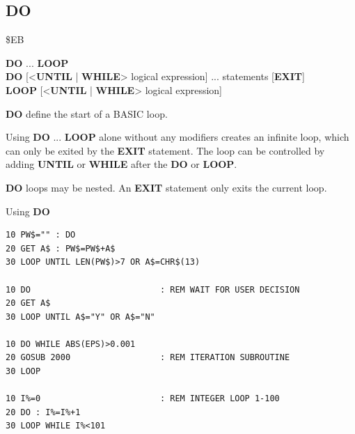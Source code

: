 
\newpage
\subsection{DO}
\begin{description}[leftmargin=2cm,style=nextline]
\item [Token:]    \$EB

\item [Format:]   {\bf DO} ... {\bf LOOP} \\
                  {\bf DO} [<{\bf UNTIL} | {\bf WHILE}> logical expression] ... statements [{\bf EXIT}] \\
                  {\bf LOOP} [<{\bf UNTIL} | {\bf WHILE}> logical expression]

\item [Usage:]    {\bf DO} define the start of a BASIC loop.

                  Using {\bf DO} ... {\bf LOOP} alone without any modifiers creates an infinite loop, which can only be exited by the {\bf EXIT} statement. The loop can be controlled by adding {\bf UNTIL} or {\bf WHILE} after the {\bf DO} or {\bf LOOP}.

\item [Remarks:]  {\bf DO} loops may be nested. An {\bf EXIT} statement only exits the current loop.

\item [Examples:] Using {\bf DO}

\begin{tcolorbox}[colback=black,coltext=white]
\verbatimfont{\codefont}
\begin{verbatim}
10 PW$="" : DO
20 GET A$ : PW$=PW$+A$
30 LOOP UNTIL LEN(PW$)>7 OR A$=CHR$(13)

10 DO                          : REM WAIT FOR USER DECISION
20 GET A$
30 LOOP UNTIL A$="Y" OR A$="N"

10 DO WHILE ABS(EPS)>0.001
20 GOSUB 2000                  : REM ITERATION SUBROUTINE
30 LOOP

10 I%=0                        : REM INTEGER LOOP 1-100
20 DO : I%=I%+1
30 LOOP WHILE I%<101
\end{verbatim}
\end{tcolorbox}
\end{description}


\newpage
